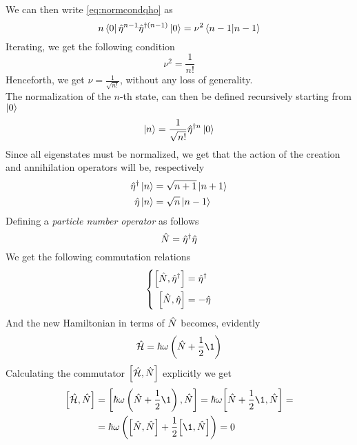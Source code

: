 \documentclass[../qm.tex]{subfiles}
\begin{document}
	We can then write \eqref{eq:normcondqho} as
	\begin{equation*}
		n\bra{0}\opr{\eta}^{n-1}\adj[(n-1)]{\opr{\eta}}\ket{0}=\nu^2\braket{n-1}
	\end{equation*}
	Iterating, we get the following condition
	\begin{equation}
		\nu^2=\frac{1}{n!}
		\label{eq:normcond}
	\end{equation}
	Henceforth, we get $\nu=\frac{1}{\sqrt{n!}}$, without any loss of generality.\\
	The normalization of the $n$-th state, can then be defined recursively starting from $\ket{0}$
	\begin{equation}
		\ket{n}=\frac{1}{\sqrt{n!}}\adj[n]{\opr{\eta}}\ket{0}
		\label{eq:qhoeigenstates}
	\end{equation}
	Since all eigenstates must be normalized, we get that the action of the creation and annihilation operators will be, respectively
	\begin{equation}
		\begin{aligned}
			\adj{\opr{\eta}}\ket{n}&=\sqrt{n+1}\ket{n+1}\\
			\opr{\eta}\ket{n}&=\sqrt{n}\ket{n-1}
		\end{aligned}
		\label{eq:annihilationcreationaction}
	\end{equation}
	Defining a \textit{particle number operator} as follows
	\begin{equation}
		\opr{N}=\adj{\opr{\eta}}\opr{\eta}
		\label{eq:numberoperatordef}
	\end{equation}
	We get the following commutation relations
	\begin{equation}
		\left\{ \begin{aligned}
				\comm{\opr{N}}{\adj{\opr{\eta}}}&=\adj{\opr{\eta}}\\
				\comm{\opr{N}}{\opr{\eta}}&=-\opr{\eta}
		\end{aligned}\right.
		\label{eq:ncommrel}
	\end{equation}
	And the new Hamiltonian in terms of $\opr{N}$ becomes, evidently
	\begin{equation}
		\opr{\ham}=\hbar\omega\left( \opr{N}+\frac{1}{2}\1 \right)
		\label{eq:numberopham}
	\end{equation}
	Calculating the commutator $\comm{\opr{\ham}}{\opr{N}}$ explicitly we get
	\begin{equation}
		\begin{aligned}
			\comm{\opr{\ham}}{\opr{N}}&=\comm{\hbar\omega\left( \opr{N}+\frac{1}{2}\1 \right)}{\opr{N}}=\hbar\omega\comm{\opr{N}+\frac{1}{2}\1}{\opr{N}}=\\
			&=\hbar\omega\left( \comm{\opr{N}}{\opr{N}}+\frac{1}{2}\comm{\1}{\opr{N}} \right)=0
		\end{aligned}
		\label{eq:hamnumbercomm}
	\end{equation}
\end{document}
